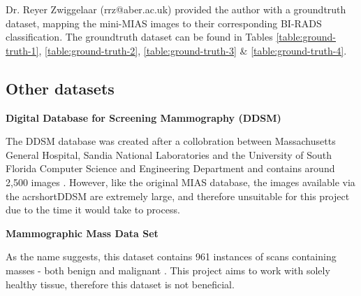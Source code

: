 Dr. Reyer Zwiggelaar (rrz@aber.ac.uk) provided the author with a groundtruth dataset, mapping the mini-\acrshort{MIAS} images to their corresponding BI-RADS classification. The groundtruth dataset can be found in Tables \ref{table:ground-truth-1}, \ref{table:ground-truth-2}, \ref{table:ground-truth-3} \& \ref{table:ground-truth-4}.

\newpage
\subsection{Other datasets}

\noindent \textbf{Digital Database for Screening Mammography (DDSM)}

The \acrshort{DDSM} database was created after a collobration between Massachusetts General Hospital, Sandia National Laboratories and the University of South Florida Computer Science and Engineering Department and contains around 2,500 images \cite{Heath_Bowyer_Kopans_Moore_Kegelmeyer_Processing} \cite{Heath_Bowyer_Kopans_Kegelmeyer_Moore_Chang_MunishKumaran_1998}.
However, like the original \acrshort{MIAS} database, the images available via the acrshort{DDSM} are extremely large, and therefore unsuitable for this project due to the time it would take to process.

\noindent \textbf{Mammographic Mass Data Set}

As the name suggests, this dataset contains 961 instances of scans containing masses - both benign and malignant \cite{Elter_Schulz-Wendtland_Wittenberg_2007}. This project aims to work with solely healthy tissue, therefore this dataset is not beneficial.
